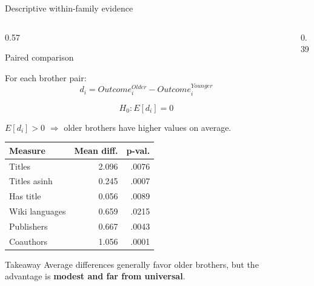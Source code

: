 \documentclass[aspectratio=169,10pt]{beamer}
\begin{document}
\begin{frame}{Descriptive within-family evidence}

\begin{columns}[T,onlytextwidth]

\begin{column}{0.57\textwidth}

\begin{block}{Paired comparison}
\footnotesize

For each brother pair:
\[
d_i = Outcome^{Older}_i - Outcome^{Younger}_i
\]

\[
H_0: E[d_i]=0
\]

\centering
\(E[d_i]>0\) $\Rightarrow$ older brothers have higher values on average.
\end{block}

\vspace{0.15em}

\centering

{\scriptsize
\setlength{\tabcolsep}{5pt}
\renewcommand{\arraystretch}{1.13}

\begin{tabular}{lrr}
\toprule
\textbf{Measure} & \textbf{Mean diff.} & \textbf{p-val.}\\
\midrule
Titles & 2.096 & .0076\\
Titles asinh & 0.245 & .0007\\
Has title & 0.056 & .0089\\
Wiki languages & 0.659 & .0215\\
Publishers & 0.667 & .0043\\
Coauthors & 1.056 & .0001\\
\bottomrule
\end{tabular}
}

\vspace{0.20em}

\begin{block}{Takeaway}
\footnotesize
Average differences generally favor older brothers,
but the advantage is \textbf{modest and far from universal}.
\end{block}

\end{column}

\begin{column}{0.39\textwidth}


\end{column}
\end{columns}
\end{frame}
\end{document}
